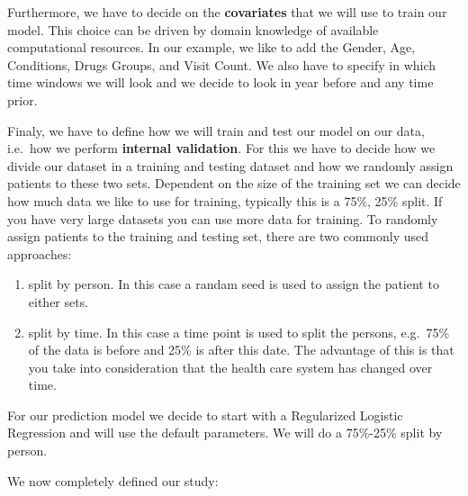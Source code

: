 \documentclass[]{article}
\providecommand{\tightlist}{%
  \setlength{\itemsep}{0pt}\setlength{\parskip}{0pt}}
\begin{document}
Furthermore, we have to decide on the \textbf{covariates} that we will
use to train our model. This choice can be driven by domain knowledge of
available computational resources. In our example, we like to add the
Gender, Age, Conditions, Drugs Groups, and Visit Count. We also have to
specify in which time windows we will look and we decide to look in year
before and any time prior.

Finaly, we have to define how we will train and test our model on our
data, i.e.~how we perform \textbf{internal validation}. For this we have
to decide how we divide our dataset in a training and testing dataset
and how we randomly assign patients to these two sets. Dependent on the
size of the training set we can decide how much data we like to use for
training, typically this is a 75\%, 25\% split. If you have very large
datasets you can use more data for training. To randomly assign patients
to the training and testing set, there are two commonly used approaches:

\begin{enumerate}
\def\labelenumi{\arabic{enumi}.}
\tightlist
\item
  split by person. In this case a randam seed is used to assign the
  patient to either sets.
\item
  split by time. In this case a time point is used to split the persons,
  e.g.~75\% of the data is before and 25\% is after this date. The
  advantage of this is that you take into consideration that the health
  care system has changed over time.
\end{enumerate}

For our prediction model we decide to start with a Regularized Logistic
Regression and will use the default parameters. We will do a 75\%-25\%
split by person.

We now completely defined our study:
\end{document}
